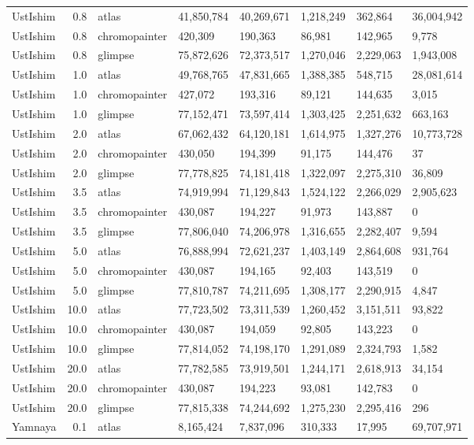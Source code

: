 {\begin{longtable}[t]{lrllllll}
UstIshim & 0.8 & atlas & 41,850,784 & 40,269,671 & 1,218,249 & 362,864 & 36,004,942\\
UstIshim & 0.8 & chromopainter & 420,309 & 190,363 & 86,981 & 142,965 & 9,778\\
UstIshim & 0.8 & glimpse & 75,872,626 & 72,373,517 & 1,270,046 & 2,229,063 & 1,943,008\\
UstIshim & 1.0 & atlas & 49,768,765 & 47,831,665 & 1,388,385 & 548,715 & 28,081,614\\
UstIshim & 1.0 & chromopainter & 427,072 & 193,316 & 89,121 & 144,635 & 3,015\\
UstIshim & 1.0 & glimpse & 77,152,471 & 73,597,414 & 1,303,425 & 2,251,632 & 663,163\\
UstIshim & 2.0 & atlas & 67,062,432 & 64,120,181 & 1,614,975 & 1,327,276 & 10,773,728\\
UstIshim & 2.0 & chromopainter & 430,050 & 194,399 & 91,175 & 144,476 & 37\\
UstIshim & 2.0 & glimpse & 77,778,825 & 74,181,418 & 1,322,097 & 2,275,310 & 36,809\\
UstIshim & 3.5 & atlas & 74,919,994 & 71,129,843 & 1,524,122 & 2,266,029 & 2,905,623\\
UstIshim & 3.5 & chromopainter & 430,087 & 194,227 & 91,973 & 143,887 & 0\\
UstIshim & 3.5 & glimpse & 77,806,040 & 74,206,978 & 1,316,655 & 2,282,407 & 9,594\\
UstIshim & 5.0 & atlas & 76,888,994 & 72,621,237 & 1,403,149 & 2,864,608 & 931,764\\
UstIshim & 5.0 & chromopainter & 430,087 & 194,165 & 92,403 & 143,519 & 0\\
UstIshim & 5.0 & glimpse & 77,810,787 & 74,211,695 & 1,308,177 & 2,290,915 & 4,847\\
UstIshim & 10.0 & atlas & 77,723,502 & 73,311,539 & 1,260,452 & 3,151,511 & 93,822\\
UstIshim & 10.0 & chromopainter & 430,087 & 194,059 & 92,805 & 143,223 & 0\\
UstIshim & 10.0 & glimpse & 77,814,052 & 74,198,170 & 1,291,089 & 2,324,793 & 1,582\\
UstIshim & 20.0 & atlas & 77,782,585 & 73,919,501 & 1,244,171 & 2,618,913 & 34,154\\
UstIshim & 20.0 & chromopainter & 430,087 & 194,223 & 93,081 & 142,783 & 0\\
UstIshim & 20.0 & glimpse & 77,815,338 & 74,244,692 & 1,275,230 & 2,295,416 & 296\\
Yamnaya & 0.1 & atlas & 8,165,424 & 7,837,096 & 310,333 & 17,995 & 69,707,971\\

\end{longtable}}
